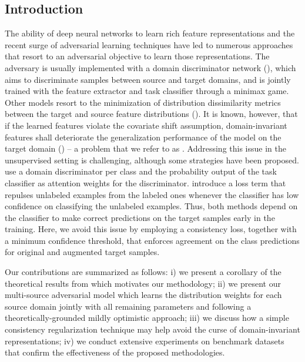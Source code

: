 \subsection{Introduction}
\label{sec:modafm_intro}
The ability of deep neural networks to learn rich feature representations and the recent surge of adversarial learning techniques have led to numerous approaches that resort to an adversarial objective to learn those representations. The adversary is usually implemented with a domain discriminator network (\citet{Ganin2015}), which aims to discriminate samples between source and target domains, and is jointly trained with the feature extractor and task classifier through a minimax game. Other models resort to the minimization of  distribution dissimilarity metrics between the target and source feature distributions (\citet{Ferreira2019, Guo2018}). It is known, however, that if the learned features violate the covariate shift assumption, domain-invariant features shall deteriorate the generalization performance of the model on the target domain (\citet{Zhao2019}) -- a problem that we refer to as . Addressing this issue in the unsupervised setting is challenging, although some strategies have been proposed. \citet{Pei2018} use a domain discriminator per class and the probability output of the task classifier as attention weights for the discriminator. \citet{Sebag2019} introduce a loss term that repulses unlabeled examples from the labeled ones whenever the classifier has low confidence on classifying the unlabeled examples. Thus, both methods depend on the classifier to make correct predictions on the target samples early in the training. Here, we avoid this issue by employing a consistency loss, together with a minimum confidence threshold, that enforces agreement on the class predictions for original and augmented target samples.

Our contributions are summarized as follows: i) we present a corollary of the theoretical results from \citet{BenDavid2010} which motivates our methodology; ii) we present our multi-source adversarial model which learns the distribution weights for each source domain jointly with all remaining parameters and following a theoretically-grounded mildly optimistic approach; iii) we discuss how a simple consistency regularization technique may help avoid the curse of domain-invariant representations; iv) we conduct extensive experiments on benchmark datasets that confirm the effectiveness of the proposed methodologies.


